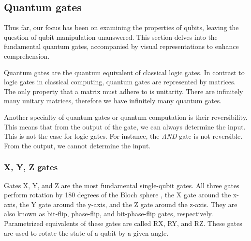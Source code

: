 \subsection*{Quantum gates}
Thus far, our focus has been on examining the properties of qubits, leaving the question of qubit manipulation unanswered. This section delves into the fundamental quantum gates, accompanied by visual representations to enhance comprehension.

Quantum gates are the quantum equivalent of classical logic gates. In contrast to logic gates in classical computing, quantum gates are represented by matrices. The only property that a matrix must adhere to is unitarity. There are infinitely many unitary matrices, therefore we have infinitely many quantum gates.

Another specialty of quantum gates or quantum computation is their reversibility. This means that from the output of the gate, we can always determine the input. This is not the case for logic gates. For instance, the \textit{AND} gate is not reversible. From the output, we cannot determine the input.

\subsubsection*{X, Y, Z gates}
Gates X, Y, and Z are the most fundamental single-qubit gates. All three gates perform rotation by 180 degrees of the Bloch sphere , the X gate around the x-axis, the Y gate around the y-axis, and the Z gate around the z-axis. They are also known as bit-flip, phase-flip, and bit-phase-flip gates, respectively. Parametrized equivalents of these gates are called RX, RY, and RZ. These gates are used to rotate the state of a qubit by a given angle.

